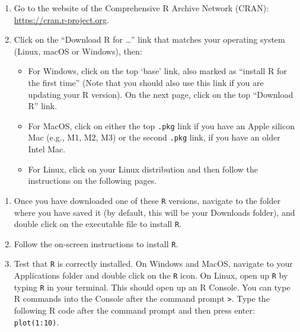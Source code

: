 \documentclass[
  letterpaper,
  DIV=11,
  numbers=noendperiod]{scrreprt}
\providecommand{\tightlist}{%
  \setlength{\itemsep}{0pt}\setlength{\parskip}{0pt}}\usepackage{longtable,booktabs,array}
\begin{document}
\begin{enumerate}
\def\labelenumi{\arabic{enumi}.}
\item
  Go to the website of the Comprehensive R Archive Network (CRAN):
  \url{https://cran.r-project.org}.
\item
  Click on the ``Download R for \ldots{}'' link that matches your
  operating system (Linux, macOS or Windows), then:

  \begin{itemize}
  \tightlist
  \item
    For Windows, click on the top `base' link, also marked as ``install
    R for the first time'' (Note that you should also use this link if
    you are updating your R version). On the next page, click on the top
    ``Download R'' link.
  \item
    For MacOS, click on either the top \texttt{.pkg} link if you have an
    Apple silicon Mac (e.g., M1, M2, M3) or the second \texttt{.pkg}
    link, if you have an older Intel Mac.
  \item
    For Linux, click on your Linux distribution and then follow the
    instructions on the following pages.
  \end{itemize}
\end{enumerate}

\begin{enumerate}
\def\labelenumi{\arabic{enumi}.}
\setcounter{enumi}{2}
\item
  Once you have downloaded one of these \texttt{R} versions, navigate to
  the folder where you have saved it (by default, this will be your
  Downloads folder), and double click on the executable file to install
  \texttt{R}.
\item
  Follow the on-screen instructions to install \texttt{R}.
\item
  Test that \texttt{R} is correctly installed. On Windows and MacOS,
  navigate to your Applications folder and double click on the
  \texttt{R} icon. On Linux, open up \texttt{R} by typing \texttt{R} in
  your terminal. This should open up an R Console. You can type R
  commands into the Console after the command prompt
  \texttt{\textgreater{}}. Type the following R code after the command
  prompt and then press enter: \texttt{plot(1:10)}.
\end{enumerate}
\end{document}
